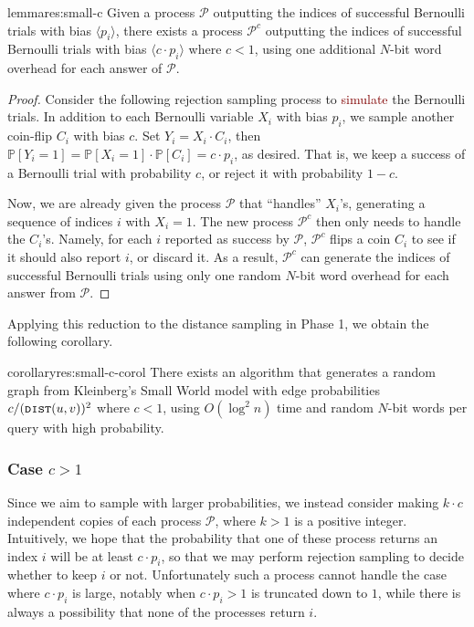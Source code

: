 \begin{restatable}{lemma}{res:small-c}
Given a process $\mathcal{P}$ outputting the indices of successful Bernoulli trials with bias $\langle p_i\rangle$, there exists a process $\mathcal{P}^c$ outputting the indices of successful Bernoulli trials with bias $\langle c\cdot p_i\rangle$ where $c<1$,
using one additional $N$-bit word overhead for each answer of $\mathcal{P}$.
\end{restatable}
\begin{proof}
Consider the following rejection sampling process to \textcolor{Maroon}{simulate} the Bernoulli trials.
In addition to each Bernoulli variable $X_i$ with bias $p_i$, we sample another coin-flip $C_i$ with bias $c$.
Set $Y_i = X_i \cdot C_i$, then $\mathbb P[Y_i = 1] = \mathbb P[X_i = 1]\cdot\mathbb P[C_i] = c\cdot p_i$, as desired.
That is, we keep a success of a Bernoulli trial with probability $c$, or reject it with probability $1-c$.

Now, we are already given the process $\mathcal{P}$ that ``handles'' $X_i$'s, generating a sequence of indices $i$ with $X_i = 1$.
The new process $\mathcal{P}^c$ then only needs to handle the $C_i$'s. Namely, for each $i$ reported as success by $\mathcal{P}$, $\mathcal{P}^c$ flips a coin $C_i$ to see if it should also report $i$, or discard it.
As a result, $\mathcal{P}^c$ can generate the indices of successful Bernoulli trials using only one random $N$-bit word overhead for each answer from $\mathcal{P}$.
\end{proof}
Applying this reduction to the distance sampling in Phase 1, we obtain the following corollary.
\begin{restatable}{corollary}{res:small-c-corol}
There exists an algorithm that generates a random graph from Kleinberg's Small World model with edge probabilities $c/(\texttt{\textsc{dist}}(u,v))^2$ where $c<1$,
using $O(\log^2 n)$ time and random $N$-bit words per  query with high probability.
\end{restatable}

\subsubsection{Case $c > 1$}

Since we aim to sample with larger probabilities, we instead consider making $k\cdot c$ independent copies of each process $\mathcal{P}$, where $k>1$ is a positive integer.
Intuitively, we hope that the probability that one of these process returns an index $i$ will be at least $c\cdot p_i$, so that we may perform rejection sampling to decide whether to keep $i$ or not.
Unfortunately such a process cannot handle the case where $c\cdot p_i$ is large, notably when $c\cdot p_i > 1$ is truncated down to $1$, while there is always a possibility that none of the processes return $i$.

